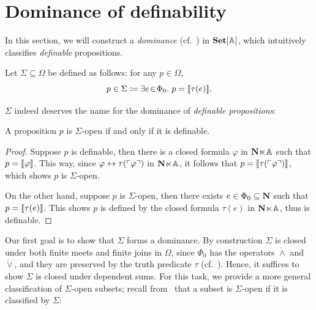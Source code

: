 \section{Dominance of definability}\label{sec:dominanceofdefinable}

In this section, we will construct a \emph{dominance} (cf.~) in $\mathbf{Set}[\mathbb{A}]$, which intuitively classifies \emph{definable} propositions. 

\begin{definition}\label{def:dominanceofdefinableprop}
  Let $\Sigma \subseteq \Omega$ be defined as follows: for any $p\in\Omega$,
  \[ p \in \Sigma \coloneq \exists e\!\in\!\Phi_0.\  p = \llbracket\tau(e)\rrbracket. \]
\end{definition}

$\Sigma$ indeed deserves the name for the dominance of \emph{definable propositions}:

\begin{lemma}\label{lem:definableareopen}
  A proposition $p$ is $\Sigma$-open if and only if it is definable.
\end{lemma}
\begin{proof}
  Suppose $p$ is definable, then there is a closed formula $\varphi$ in $\mathbf N\hspace{-.4ex}\ltimes\hspace{-.4ex}\mathbb{A}$ such that $p = \llbracket\varphi\rrbracket$. This way, since $\varphi \leftrightarrow \tau(\ulcorner \varphi \urcorner)$ in $\mathbf N\hspace{-.4ex}\ltimes\hspace{-.4ex}\mathbb{A}$, it follows that $p = \llbracket\tau(\ulcorner \varphi \urcorner)\rrbracket$, which shows $p$ is $\Sigma$-open.

  On the other hand, suppose $p$ is $\Sigma$-open, then there exists $e\in\Phi_0\subseteq\mathbf N$ such that $p = \llbracket\tau(e)\rrbracket$. This shows $p$ is defined by the closed formula $\tau(e)$ in $\mathbf N\hspace{-.4ex}\ltimes\hspace{-.4ex}\mathbb{A}$, thus is definable.
\end{proof}

Our first goal is to show that $\Sigma$ forms a dominance. By construction $\Sigma$ is closed under both finite meets and finite joins in $\Omega$, since $\Phi_0$ has the operators $\dot\wedge$ and $\dot{\vee}$, and they are preserved by the truth predicate $\tau$ (cf.~). Hence, it suffices to show $\Sigma$ is closed under dependent sums. For this task, we provide a more general classification of $\Sigma$-open subsets; recall from~ that a subset is $\Sigma$-open if it is classified by $\Sigma$:

